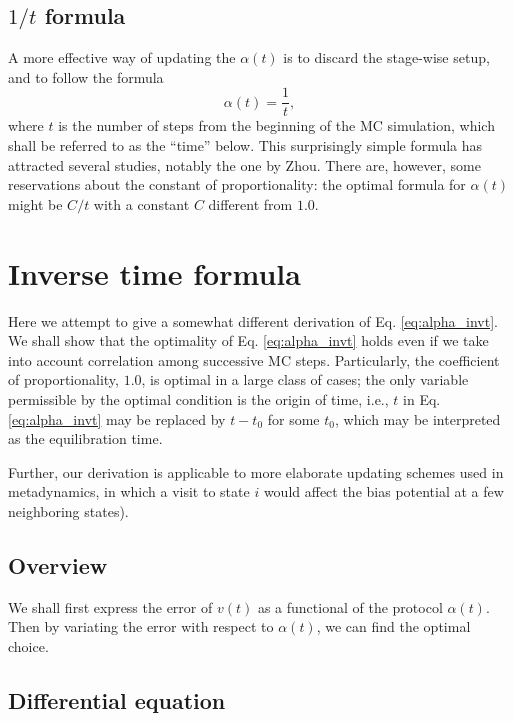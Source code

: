 \documentclass[reprint]{revtex4-1}
\begin{document}
\subsection{$1/t$ formula}



A more effective way
of updating the $\alpha(t)$
is to discard the stage-wise setup,
and to follow the formula
%
\begin{equation}
  \alpha(t) = \frac{1}{t},
  \label{eq:alpha_invt}
\end{equation}
%
where $t$ is the number of steps
from the beginning of the MC simulation,
which shall be referred to as the ``time'' below.
%
This surprisingly simple formula has attracted
several studies, notably the one by Zhou.
%
There are, however, some reservations about
the constant of proportionality:
the optimal formula for $\alpha(t)$
might be $C/t$ with a constant $C$
different from $1.0$.



\section{Inverse time formula}



Here we attempt to give a somewhat different derivation
of Eq. \eqref{eq:alpha_invt}.
%
We shall show that the optimality of Eq. \eqref{eq:alpha_invt}
holds even if we take into account
correlation among successive MC steps.
%
Particularly, the coefficient of proportionality, $1.0$,
is optimal in a large class of cases;
%
the only variable permissible by the optimal condition
is the origin of time,
i.e., $t$ in Eq. \eqref{eq:alpha_invt}
may be replaced by $t - t_0$ for some $t_0$,
which may be interpreted as the equilibration time.

Further, our derivation is applicable
to more elaborate updating schemes used in metadynamics,
in which a visit to state $i$ would affect
the bias potential at a few neighboring states).


\subsection{Overview}


We shall first express the error of $v(t)$
as a functional of the protocol $\alpha(t)$.
Then by variating the error with respect to $\alpha(t)$,
we can find the optimal choice.



\subsection{Differential equation}
\end{document}
